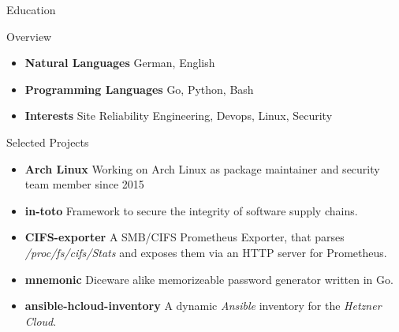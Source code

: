 \documentclass[]{mcdowellcv}
\begin{document}
\begin{cvsection}{Education}
\begin{cvsection}{Overview}
\begin{cvsubsection}{}{}{}
\begin{itemize}
\item \textbf{Natural Languages} German, English
\item \textbf{Programming Languages} Go, Python, Bash
\item \textbf{Interests} Site Reliability Engineering, Devops, Linux, Security
\end{itemize}
\end{cvsubsection}
\end{cvsection}

\end{cvsection}
\begin{cvsection}{Selected Projects}
\begin{cvsubsection}{}{}{}
\begin{itemize}
\item \textbf{Arch Linux} Working on Arch Linux as package maintainer and security team member since 2015
\item \textbf{in-toto} Framework to secure the integrity of software supply chains.
\item \textbf{CIFS-exporter} A SMB/CIFS Prometheus Exporter, that parses \textit{/proc/fs/cifs/Stats} and exposes them via an HTTP server for Prometheus.
\item \textbf{mnemonic} Diceware alike memorizeable password generator written in Go.
\item \textbf{ansible-hcloud-inventory} A dynamic \textit{Ansible} inventory for the \textit{Hetzner Cloud}.
\end{itemize}
\end{cvsubsection}
\end{cvsection}
\end{document}
